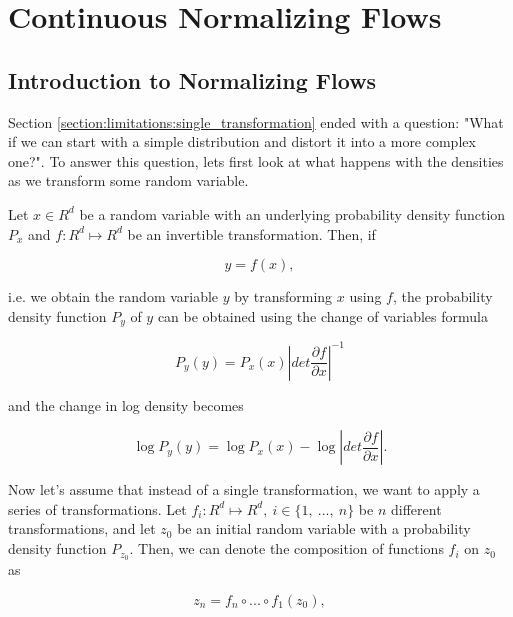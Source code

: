 \chapter{Continuous Normalizing Flows}
\label{chapter:cnf}

\section{Introduction to Normalizing Flows}
\label{section:cnf:normalizing_flows}

Section \ref{section:limitations:single_transformation} ended with a question: "What if we can start with a simple distribution and distort it into a more complex one?". To answer this question, lets first look at what happens with the densities as we transform some random variable.

Let $ x \in R^d $ be a random variable with an underlying probability density function $ P_x $ and $ f: R^d \mapsto R^d $ be an invertible transformation. Then, if

\begin{displaymath}
    y = f(x),
\end{displaymath}

i.e. we obtain the random variable $ y $ by transforming $ x $ using $ f $, the probability density function $ P_y $ of $ y $ can be obtained using the change of variables formula

\begin{equation}
    \label{equation:cnf:nf:change_density}
    P_y(y) = P_x(x) \left | det \frac{\partial f}{\partial x} \right |^{-1}
\end{equation}

and the change in log density becomes

\begin{equation}
    \label{equation:cnf:nf:change_log_density}
    \log P_y(y) = \log P_x(x) - \log \left | det \frac{\partial f}{\partial x} \right |.
\end{equation}

Now let's assume that instead of a single transformation, we want to apply a series of transformations. Let $ f_i: R^d \mapsto R^d, \ i \in \{1, \ ..., \ n\} $ be $ n $ different transformations, and let $ z_0 $ be an initial random variable with a probability density function $ P_{z_0} $. Then, we can denote the composition of functions $ f_i $ on $ z_0 $ as

\begin{displaymath}
    z_n = f_n \circ ... \circ f_1(z_0),
\end{displaymath}

